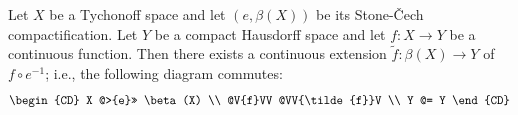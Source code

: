 Let $X$ be a Tychonoff space and let $(e, \beta(X))$ be its Stone-Čech compactification. Let $Y$ be a compact Hausdorff space and let $f: X \to Y$ be a continuous function. Then there exists a continuous extension $\tilde{f}: \beta(X) \to Y$ of $f \circ e^{-1}$; i.e., the following diagram commutes:
\[
\begin{CD}
X @>{e}>> \beta(X) \\
@V{f}VV @VV{\tilde{f}}V \\
Y @= Y
\end{CD}
\]

